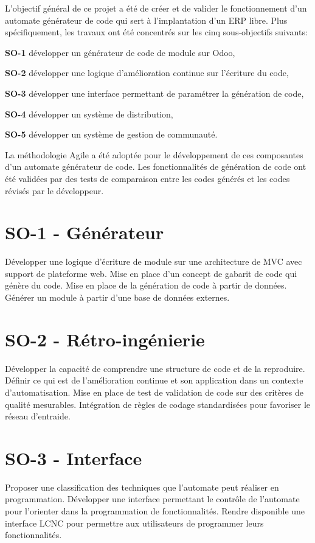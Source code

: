 \label{sec:Theme1} \label{chapitre_methode}

L’objectif général de ce projet a été de créer et de valider le fonctionnement d’un automate générateur de code qui sert à l’implantation d’un ERP libre. Plus spécifiquement, les travaux ont été concentrés sur les cinq sous-objectifs suivants:

\textbf{SO-1} développer un générateur de code de module sur Odoo,

\textbf{SO-2} développer une logique d'amélioration continue sur l'écriture du code,

\textbf{SO-3} développer une interface permettant de paramétrer la génération de code,

\textbf{SO-4} développer un système de distribution,

\textbf{SO-5} développer un système de gestion de communauté.

La méthodologie Agile a été adoptée pour le développement de ces composantes d'un automate générateur de code. Les fonctionnalités de génération de code ont été validées par des tests de comparaison entre les codes générés et les codes révisés par le développeur.


\section{SO-1 - Générateur}
Développer une logique d’écriture de module sur une architecture de MVC avec support de plateforme web. Mise en place d’un concept de gabarit de code qui génère du code. Mise en place de la génération de code à partir de données. Générer un module à partir d’une base de données externes.

\section{SO-2 - Rétro-ingénierie}
Développer la capacité de comprendre une structure de code et de la reproduire. Définir ce qui est de l’amélioration continue et son application dans un contexte d’automatisation. Mise en place de test de validation de code sur des critères de qualité mesurables. Intégration de règles de codage standardisées pour favoriser le réseau d’entraide.

\section{SO-3 - Interface}
Proposer une classification des techniques que l’automate peut réaliser en programmation. Développer une interface permettant le contrôle de l’automate pour l’orienter dans la programmation de fonctionnalités. Rendre disponible une interface LCNC pour permettre aux utilisateurs de programmer leurs fonctionnalités.

